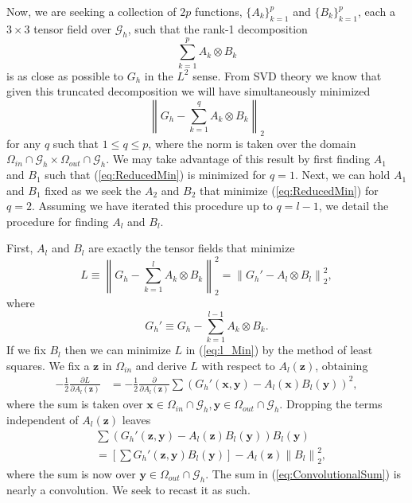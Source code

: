 \documentclass[preprint,12pt]{elsarticle}
\newcommand{\norm}[1]{\left\lVert#1\right\rVert}
\newcommand{\B}[1]{\mathbf{#1}}
\newcommand{\C}[1]{\mathcal{#1}}
\begin{document}
Now, we are seeking a collection of $2p$ functions, $\{A_k\}_{k=1}^p$ and $\{B_k\}_{k=1}^p$, each a $3\times 3$ tensor field over $\C{G}_h$, such that the rank-1 decomposition
\begin{equation}
\sum_{k=1}^{p} A_k \otimes B_k
\end{equation}
is as close as possible to $G_h$ in the $L^2$ sense. From SVD theory we know that given this truncated decomposition we will have simultaneously minimized 
\begin{equation}
\norm{G_h - \sum_{k = 1}^q A_k \otimes B_k}_2
\label{eq:ReducedMin}
\end{equation}
for any $q$ such that $1\leq q \leq p$, where the norm is taken over the domain $\Omega_{in}\cap\C{G}_h\times\Omega_{out}\cap\C{G}_h$. We may take advantage of this result by first finding $A_1$ and $B_1$ such that (\ref{eq:ReducedMin}) is minimized for $q=1$. Next, we can hold $A_1$ and $B_1$ fixed as we seek the $A_2$ and $B_2$ that minimize (\ref{eq:ReducedMin}) for $q=2$. Assuming we have iterated this procedure up to $q = l-1$, we detail the procedure for finding $A_l$ and $B_l$.

First, $A_l$ and $B_l$ are exactly the tensor fields that minimize
\begin{equation}
L\equiv \norm{G_h - \sum_{k = 1}^{l} A_k\otimes B_k}_2^2 = \norm{G_h' - A_l\otimes B_l}_2^2,
\label{eq:l_Min}
\end{equation}
where
\begin{equation}
G_h'\equiv G_h - \sum_{k = 1}^{l-1} A_k\otimes B_k.
\end{equation}
If we fix $B_l$ then we can minimize $L$ in (\ref{eq:l_Min}) by the method of least squares.  We fix a $\B{z}$ in $\Omega_{in}$ and derive $L$ with respect to $A_l(\B{z})$, obtaining
\begin{align}
-\frac{1}{2} \frac{\partial L}{\partial A_l(\B{z})}
&=
-\frac{1}{2} \frac{\partial}{\partial A_l(\B{z})} \sum \left(G_h'(\B{x},\B{y}) - A_l(\B{x})B_l(\B{y})\right)^2,
\end{align}
where the sum is taken over $\B{x}\in\Omega_{in}\cap\C{G}_h,\B{y}\in\Omega_{out}\cap\C{G}_h$. Dropping the terms independent of  $A_l(\B{z})$ leaves
\begin{align}
&
\sum \left(G_h'(\B{z},\B{y}) - A_l(\B{z})B_l(\B{y})\right)B_l(\B{y}) \nonumber \\
&=
\left[ \sum G_h'(\B{z},\B{y})B_l(\B{y}) \right] - A_l(\B{z})\norm{B_l}_2^2,
\label{eq:ConvolutionalSum}
\end{align}
where the sum is now over $\B{y}\in\Omega_{out}\cap\C{G}_h$. The sum in (\ref{eq:ConvolutionalSum}) is  nearly a convolution. We seek to recast it as such.
\end{document}
